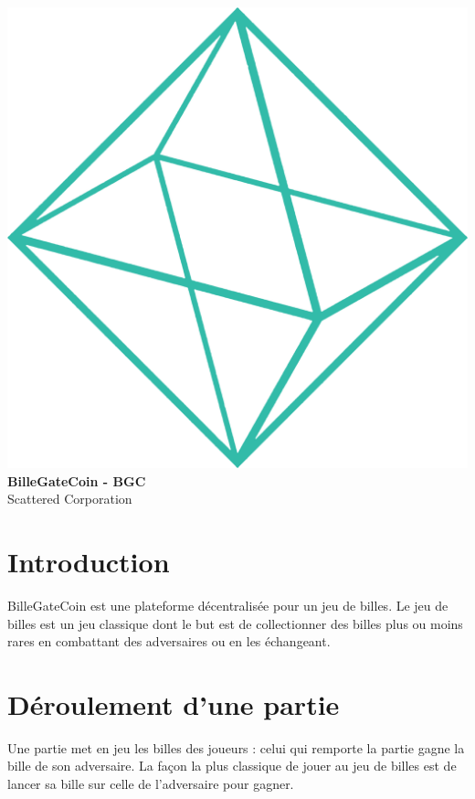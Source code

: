 \documentclass{article}
\begin{document}
\makeatletter
    \begin{titlepage}
        \begin{center}
            \pagecolor{background}\afterpage{\nopagecolor}
            \color{white}
            \includegraphics[width=0.5\linewidth]{shape.png}\\[10ex]
            {\huge \bfseries BilleGateCoin - BGC}\\[2ex] 
            {\LARGE Scattered Corporation}\\[50ex] 

            {\large \@date}
        \end{center}
    \end{titlepage}
\makeatother
\thispagestyle{empty}

\newpage
\begin{center}
\color{white}
\pagecolor{background}\afterpage{\nopagecolor}
\tableofcontents
\end{center}
\newpage

\section{Introduction}
BilleGateCoin est une plateforme décentralisée pour un jeu de billes.
Le jeu de billes est un jeu classique dont le but est de collectionner des billes plus ou moins rares en combattant des adversaires ou en les échangeant.

\section{Déroulement d'une partie}
Une partie met en jeu les billes des joueurs : celui qui remporte la partie gagne la bille de son adversaire.
La façon la plus classique de jouer au jeu de billes est de lancer sa bille sur celle de l'adversaire pour gagner.
\end{document}
